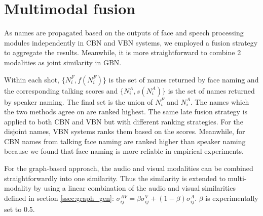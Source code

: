 \section{Multimodal fusion}
\label{sec:multimodal}

As names are propagated based on the outputs of face and speech processing modules independently in CBN and VBN systems, 
we employed a fusion strategy to aggregate the results. 
Meanwhile, it is more straightforward to combine 2 modalities as joint similarity in GBN.

Within each shot, $\{N^F_i, f(N^F_i)\}$ is the set of names returned by face naming and the corresponding talking scores and $\{N^A_i,  s(N^A_i)\}$  is the set of names returned by speaker naming.
%
The final set is the union of ${N^F_i}$ and ${N^A_i}$. The names which the two methods agree on are ranked highest.
%
The same late fusion strategy is applied to both CBN and VBN but with different ranking strategies.
%
For the disjoint names, VBN systems ranks them based on the scores. 
Meanwhile, for CBN names from talking face naming are ranked higher than speaker naming 
because we found that face naming is more reliable in empirical experiments.
%
%

 For the graph-based approach, the audio and visual modalities can be combined straightforwardly into one similarity.
%
Thus the similarity is extended to multi-modality by using a linear combination of the audio and visual similarities defined in section \ref{ssec:graph_gen}: $\sigma^{AV}_{ij} = \beta \sigma^V_{ij} + (1-\beta) \sigma^A_{ij}$. $\beta$ is experimentally set to 0.5.

\endinput

\begin{algorithm}
  \caption{Ranking names within shots
    \label{algo:ranking}}
  \begin{algorithmic}[1]
	  \For{$s_k \in S$}
 	  	    \State{$Q_{s_k} = \emptyset$}
		    \State{Face\_naming$(s_k) \Rightarrow (N^F_i, t(N^F_i))$}
				\State{Speaker\_naming$(s_k) \Rightarrow (N^A_j, 1.0)$}
				\For{each $N^F_i$}
					\If{$\exists N^A_j / N^A_j = N^F_i$}
						\State{$Q_{s_k} = Q_{s_k} \cup \{(N^F_i, t(N^F_i) + 2.0)\}$}
					\Else
						\State{$Q_{s_k} = Q_{s_k} \cup \{(N^F_i, t(N^F_i) + 1.0)\}$}
					\EndIf
				\EndFor
				\For{each $N^A_j$}
					\If{not $\exists N^F_i / N^F_i = N^A_j$}
						\State{$Q_{s_k} = Q_{s_k} \cup \{(N^A_j, 1.0)\}$}
					\EndIf
				\EndFor
		\EndFor
  \end{algorithmic}
\end{algorithm}
%
